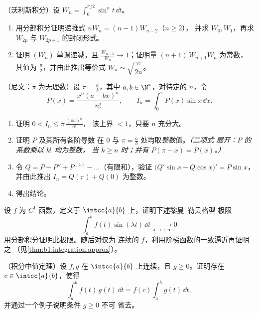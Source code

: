 \begin{exercise}[$\star\star\star$]\label{exo:b1:integration:8}
（沃利斯积分）设 $W_n = \int_0^{\pi/2} \sin^n t\,\dd t$。
\begin{enumerate}
  \item 用分部积分证明递推式 $n W_n = (n-1) W_{n-2}$（$n \geq 2$），
        并求 $W_0, W_1$，再求 $W_{2p}$ 与 $W_{2p+1}$
        的封闭形式。
  \item 证明 $(W_n)$ 单调递减，且 $\frac{W_{n+1}}{W_n}
        \to 1$；证明量 $(n+1)\,W_{n+1} W_n$ 为常数，
        其值为 $\frac\pi2$，并由此推出等价式
        $W_n \sim \sqrt{\dfrac{\pi}{2n}}$。
\end{enumerate}
\end{exercise}

\begin{exercise}[$\star\star\star$]\label{exo:b1:integration:9}
（尼文：$\pi$ 为无理数）设 $\pi = \frac ab$，其中 $a, b \in
\N^*$，对待定的 $n$，令
\[
P(x) = \frac{x^n (a - bx)^n}{n!},
\qquad
I_n = \int_0^{\pi} P(x)\sin x\, \dd x .
\]
\begin{enumerate}
  \item 证明 $0 < I_n \leq \pi\,\frac{(\pi a)^n}{n!}$，
        该上界 $< 1$，只要 $n$ 充分大。
  \item 证明 $P$ 及其所有各阶导数
        在 $0$ 与 $\pi = \frac ab$ 处均取\emph{整数}值。\emph{（二项式
        展开：$P$ 的系数乘以 $k!$ 均为整数，
        当 $k \geq n$ 时；并有 $P(\pi - x) = P(x)$。）}
  \item 令 $Q = P - P'' + P^{(4)} - \dots$（有限和），验证
        $\bigl(Q'\sin x - Q\cos x\bigr)' = P \sin x$，并由此推出
        $I_n = Q(\pi) + Q(0)$ 为整数。
  \item 得出结论。
\end{enumerate}
\end{exercise}

\begin{exercise}[$\star\star\star$]\label{exo:b1:integration:10}
设 $f$ 为 $C^1$ 函数，定义于 $\intcc{a}{b}$ 上，证明下述黎曼--勒贝格型
极限
\[
\int_a^b f(t)\sin(\lambda t)\,\dd t \xrightarrow[\lambda \to
+\infty]{} 0
\]
用分部积分证明此极限。随后对仅为
连续的 $f$，利用阶梯函数的一致逼近再证明之
（见\cref{thm:b1:integration:approx}）。
\end{exercise}

\begin{exercise}[$\star\star$]\label{exo:b1:integration:11}
（积分中值定理）设 $f, g$ 在
$\intcc{a}{b}$ 上连续，且 $g \geq 0$。证明存在 $c \in
\intcc{a}{b}$，使得
\[
\int_a^b f(t)\,g(t)\,\dd t = f(c)\int_a^b g(t)\,\dd t ,
\]
并通过一个例子说明条件 $g \geq 0$ 不可
省去。
\end{exercise}

